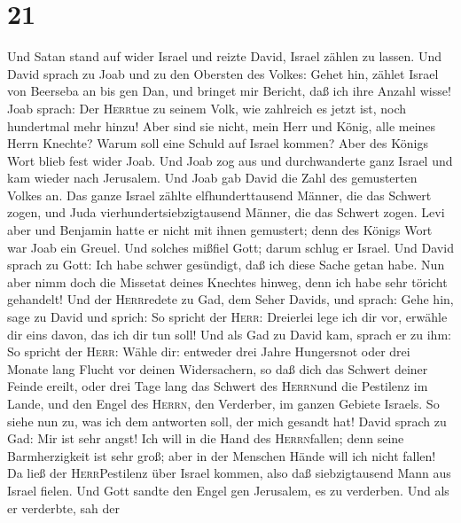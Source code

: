 \hypertarget{section-20}{%
\section{21}\label{section-20}}

 Und Satan stand auf wider Israel und reizte David, Israel
zählen zu lassen.  Und David sprach zu Joab und zu den
Obersten des Volkes: Gehet hin, zählet Israel von Beerseba an bis gen
Dan, und bringet mir Bericht, daß ich ihre Anzahl wisse! 
Joab sprach: Der \textsc{Herr}tue zu seinem Volk, wie zahlreich es jetzt
ist, noch hundertmal mehr hinzu! Aber sind sie nicht, mein Herr und
König, alle meines Herrn Knechte? Warum soll eine Schuld auf Israel
kommen?  Aber des Königs Wort blieb fest wider Joab. Und
Joab zog aus und durchwanderte ganz Israel und kam wieder nach
Jerusalem.  Und Joab gab David die Zahl des gemusterten
Volkes an. Das ganze Israel zählte elfhunderttausend Männer, die das
Schwert zogen, und Juda vierhundertsiebzigtausend Männer, die das
Schwert zogen.  Levi aber und Benjamin hatte er nicht mit
ihnen gemustert; denn des Königs Wort war Joab ein Greuel.
 Und solches mißfiel Gott; darum schlug er Israel.
 Und David sprach zu Gott: Ich habe schwer gesündigt, daß
ich diese Sache getan habe. Nun aber nimm doch die Missetat deines
Knechtes hinweg, denn ich habe sehr töricht gehandelt! 
Und der \textsc{Herr}redete zu Gad, dem Seher Davids, und sprach:
 Gehe hin, sage zu David und sprich: So spricht der
\textsc{Herr}: Dreierlei lege ich dir vor, erwähle dir eins davon, das
ich dir tun soll!  Und als Gad zu David kam, sprach er zu
ihm: So spricht der \textsc{Herr}: Wähle dir:  entweder
drei Jahre Hungersnot oder drei Monate lang Flucht vor deinen
Widersachern, so daß dich das Schwert deiner Feinde ereilt, oder drei
Tage lang das Schwert des \textsc{Herrn}und die Pestilenz im Lande, und
den Engel des \textsc{Herrn}, den Verderber, im ganzen Gebiete Israels.
So siehe nun zu, was ich dem antworten soll, der mich gesandt hat!
 David sprach zu Gad: Mir ist sehr angst! Ich will in die
Hand des \textsc{Herrn}fallen; denn seine Barmherzigkeit ist sehr groß;
aber in der Menschen Hände will ich nicht fallen!  Da
ließ der \textsc{Herr}Pestilenz über Israel kommen, also daß
siebzigtausend Mann aus Israel fielen.  Und Gott sandte
den Engel gen Jerusalem, es zu verderben. Und als er verderbte, sah der
